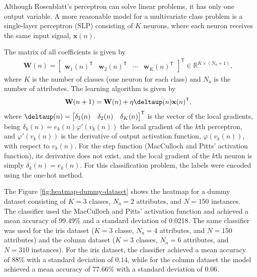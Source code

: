 \documentclass[12pt,a4paper]{article}
\newcommand{\trans}{\mathsf{T}}
\newcommand{\Real}{\mathbb{R}}
\begin{document}
Although Rosenblatt's perceptron can solve linear problems, it has only one output variable. A more reasonable model for a multivariate class problem is a single-layer perceptron (SLP) consisting of \(K\) neurons, where each neuron receives the same input signal, \(\mathbf{x}(n)\).

The matrix of all coefficients is given by
\begin{align}
    \mathbf{W}(n) = \begin{bmatrix}
        \mathbf{w}_1 (n)^\trans & \mathbf{w}_2 (n)^\trans & \cdots & \mathbf{w}_K (n)^\trans
    \end{bmatrix}^\trans \in \Real^{K \times \left(N_a+1\right)},
\end{align}
where \(K\) is the number of classes (one neuron for each class) and \(N_a\) is the number of attributes. The learning algorithm is given by
\begin{align}
    \mathbf{W}(n+1) = \mathbf{W}(n) + \eta \boldsymbol{\deltaup}(n) \mathbf{x}(n)^\trans,
\end{align}
where \(\boldsymbol{\deltaup}(n) = \begin{bmatrix}
    \delta_1(n) & \delta_2(n) & \delta_K(n)
\end{bmatrix}^\trans\) is the vector of the local gradients, being \(\delta_k(n) = e_k (n) \varphi'(v_k (n))\) the local gradient of the \(k\)th perceptron, and \(\varphi'(v_k (n))\) is the derivative of output activation function, \(\varphi(v_k (n))\), with respect to \(v_k (n)\). For the step function (MacCulloch and Pitts' activation function), its derivative does not exist, and the local gradient of the \(k\)th neuron is simply \(\delta_k(n) = e_k (n)\). For this classification problem, the labels were encoded using the one-hot method.

The Figure \ref{fig:heatmap-dummy-dataset} shows the heatmap for a dummy dataset consisting of \(K=3\) classes, \(N_a=2\) attributes, and \(N=150\) instances. The classifier used the MacCulloch and Pitts' activation function and achieved a mean accuracy of 99.49\% and a standard deviation of 0.0218. The same classifier was used for the iris dataset (\(K=3\) classe, \(N_a=4\) attributes, and \(N=150\) attributes) and the column dataset (\(K=3\) classes, \(N_a=6\) attributes, and \(N=310\) instances). For the iris dataset, the classifier achieved a mean accuracy of 88\% with a standard deviation of \(0.14\), while for the column dataset the model achieved a mean accuracy of 77.66\% with a standard deviation of \(0.06\).
\end{document}
